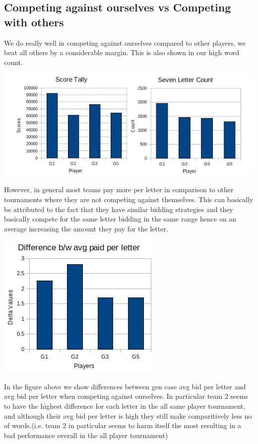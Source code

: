 \documentclass[11pt]{article}
\begin{document}
	\subsection{Competing against ourselves vs Competing with others}	
	We do really well in competing against ourselves compared to other players, we beat all others by a considerable margin. This is also shown in our high word count. 	
\begin{center}
\includegraphics[width=\textwidth]{SelftourneyCombined}
\end{center}
However, in general most teams pay more per letter in comparison to other tournaments where they are not competing against themselves. This can basically be attributed to the fact that they have similar bidding strategies and they basically compete for the same letter bidding in the same range hence on an average increasing the amount they pay for the letter. 
\begin{center}
\includegraphics[width=0.5 \textwidth]{ALLPlayer}
\end{center}

In the figure above we show differences between gen case avg bid per letter and avg bid per letter when competing against ourselves. In particular team 2 seems to have the highest difference for each letter in the all same player tournament, and although their avg bid per letter is high they still make comparitively less no of words.(i.e. team 2 in particular seems to harm itself the most resulting in a bad performance overall in the all player tournament)
\end{document}
